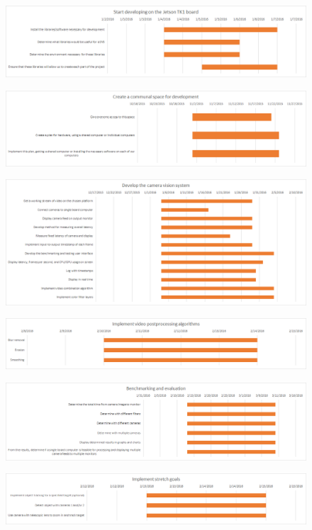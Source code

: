 \begin{figure}[H] 
\centering
\includegraphics[width=1.0\textwidth,natwidth=1210,natheight=642]{gantt/original/starting.png}  
\end{figure}
\begin{figure}[H] 
\centering
\includegraphics[width=1.0\textwidth,natwidth=1210,natheight=642]{gantt/original/communal.png}  
\end{figure}
\begin{figure}[H] 
\centering
\includegraphics[width=1.0\textwidth,natwidth=1210,natheight=642]{gantt/original/develop.png}  
\end{figure}
\begin{figure}[H] 
\centering
\includegraphics[width=1.0\textwidth,natwidth=1210,natheight=642]{gantt/original/algos.png}  
\end{figure}
\begin{figure}[H] 
\centering
\includegraphics[width=1.0\textwidth,natwidth=1210,natheight=642]{gantt/original/eval.png}  
\end{figure}
\begin{figure}[H] 
\centering
\includegraphics[width=1.0\textwidth,natwidth=1210,natheight=642]{gantt/original/stretch_goals.png}  
\end{figure}
